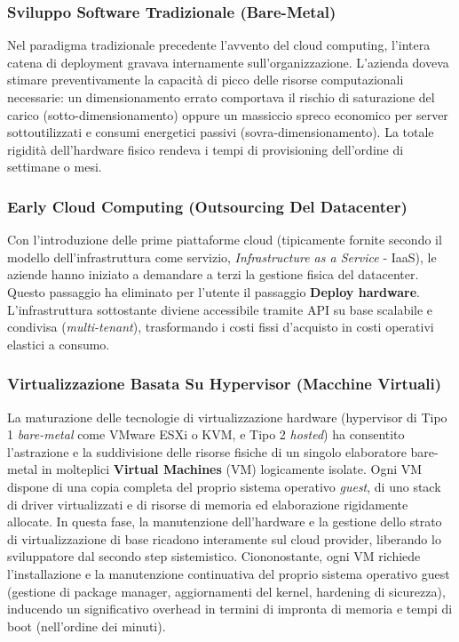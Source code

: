 \documentclass[11pt, a4paper]{article}
\begin{document}

\subsubsection{Sviluppo Software Tradizionale (Bare-Metal)}
Nel paradigma tradizionale precedente l'avvento del cloud computing, l'intera catena di deployment gravava internamente sull'organizzazione. L'azienda doveva stimare preventivamente la capacità di picco delle risorse computazionali necessarie: un dimensionamento errato comportava il rischio di saturazione del carico (sotto-dimensionamento) oppure un massiccio spreco economico per server sottoutilizzati e consumi energetici passivi (sovra-dimensionamento). La totale rigidità dell'hardware fisico rendeva i tempi di provisioning dell'ordine di settimane o mesi.

\subsubsection{Early Cloud Computing (Outsourcing Del Datacenter)}
Con l'introduzione delle prime piattaforme cloud (tipicamente fornite secondo il modello dell'infrastruttura come servizio, \emph{Infrastructure as a Service} - IaaS), le aziende hanno iniziato a demandare a terzi la gestione fisica del datacenter. Questo passaggio ha eliminato per l'utente il passaggio \textbf{Deploy hardware}. L'infrastruttura sottostante diviene accessibile tramite API su base scalabile e condivisa (\emph{multi-tenant}), trasformando i costi fissi d'acquisto in costi operativi elastici a consumo.

\subsubsection{Virtualizzazione Basata Su Hypervisor (Macchine Virtuali)}
La maturazione delle tecnologie di virtualizzazione hardware (hypervisor di Tipo 1 \emph{bare-metal} come VMware ESXi o KVM, e Tipo 2 \emph{hosted}) ha consentito l'astrazione e la suddivisione delle risorse fisiche di un singolo elaboratore bare-metal in molteplici \textbf{Virtual Machines} (VM) logicamente isolate. Ogni VM dispone di una copia completa del proprio sistema operativo \emph{guest}, di uno stack di driver virtualizzati e di risorse di memoria ed elaborazione rigidamente allocate. In questa fase, la manutenzione dell'hardware e la gestione dello strato di virtualizzazione di base ricadono interamente sul cloud provider, liberando lo sviluppatore dal secondo step sistemistico. Ciononostante, ogni VM richiede l'installazione e la manutenzione continuativa del proprio sistema operativo guest (gestione di package manager, aggiornamenti del kernel, hardening di sicurezza), inducendo un significativo overhead in termini di impronta di memoria e tempi di boot (nell'ordine dei minuti).
\end{document}
